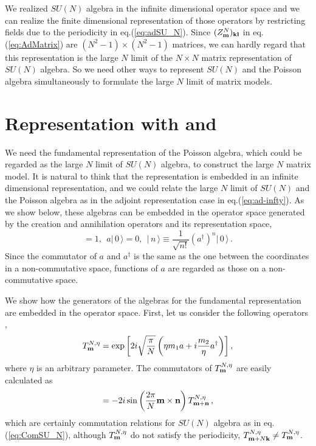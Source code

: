 \documentclass[a4paper,12pt]{article}
\newcommand{\ket}[1]{|\,#1\,\rangle}
\begin{document}
We realized $SU(N)$ algebra in the infinite dimensional operator space
and we can realize the finite dimensional representation of those
operators by restricting fields due to the periodicity in
eq.(\ref{eq:adSU_N}).
Since $(Z^{N}_{\bf m})_{\bf k l}$ in eq.(\ref{eq:AdMatrix}) are
$(N^2-1)\times (N^2-1)$ matrices, we can hardly regard that this
representation is the large $N$ limit of the $N\times N$ matrix
representation of $SU(N)$ algebra. So we need other ways to represent
$SU(N)$ and the Poisson algebra simultaneously to formulate the large
$N$ limit of matrix models.

\section{Representation with  and 
\label{sec:aadag}}
We need the fundamental representation of the Poisson algebra, which
could be regarded as the large $N$ limit of $SU(N)$ algebra, to
construct the large $N$ matrix model.
It is natural to think that the representation is embedded in an
infinite dimensional representation, and we could relate the large $N$
limit of $SU(N)$ and the Poisson algebra as in the adjoint
representation case in eq.(\ref{eq:ad-infty}).
As we show below, these algebras can be embedded in the operator space
generated by the creation and annihilation operators and its
representation space,
\begin{equation}
 [\,a,a^\dagger\,]=1,~~a\ket{0}=0,~~
  \ket{n}\equiv\frac{1}{\sqrt{n!}}(a^\dagger)^n\ket{0}\,.
  \label{eq:FockSpace}
\end{equation}
Since the commutator of $a$ and $a^\dagger$ is the same as
the one between the coordinates in a non-commutative space, functions
of $a$ are regarded as those on a non-commutative space.

We show how the generators of the algebras for the fundamental
representation are embedded in the operator space.
First, let us consider the following operators \cite{hoppesch},
\begin{equation}
 T^{N,\eta}_{\bf m}
  =  \exp\left[2i\sqrt{\frac{\pi}{N}} \left(\eta m_1 a + i
  \frac{m_2}{\eta} a^\dagger\right)\right],   \label{eq:TSU(N)}
\end{equation}
where $\eta$ is an arbitrary parameter.
The commutators  of $T^{N,\eta}_{\bf m}$ are easily calculated as
\begin{equation}
 [\,T^{N,\eta}_{\bf m}, T^{N,\eta}_{\bf n}\,]
  =-2i\sin\left(\frac{2\pi}{N}{\bf m\times n}\right)
	 T^{N,\eta}_{\bf m+n}\,, \label{eq:TSU(N)Com}
\end{equation}
which are certainly commutation relations for $SU(N)$ algebra as in
eq.(\ref{eq:ComSU_N}), although $T^{N,\eta}_{\bf m}$ do not satisfy
the periodicity,
$T^{N,\eta}_{{\bf m}+N{\bf k}} \neq T^{N,\eta}_{\bf m}$.
\end{document}
